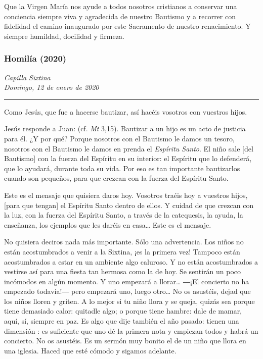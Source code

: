 \begin{body}
\begin{body}
{Que la Virgen María nos ayude a todos nosotros cristianos a conservar una conciencia siempre viva y agradecida de nuestro Bautismo y a recorrer con fidelidad el camino inaugurado por este Sacramento de nuestro renacimiento. Y siempre humildad, docilidad y firmeza.

\subsubsection{Homilía (2020)} \emph{Capilla Sixtina\\ Domingo, 12 de enero de 2020}

\begin{center}\rule{0.5\linewidth}{\linethickness}\end{center}



Como Jesús, que fue a hacerse bautizar, así hacéis vosotros con vuestros hijos.

Jesús responde a Juan:  (cf. \emph{Mt} 3,15). Bautizar a un hijo es un acto de justicia para él. ¿Y por qué? Porque nosotros con el Bautismo le damos un tesoro, nosotros con el Bautismo le damos en prenda el \emph{Espíritu Santo}. El niño sale {[}del Bautismo{]} con la fuerza del Espíritu en su interior: el Espíritu que lo defenderá, que lo ayudará, durante toda su vida. Por eso es tan importante bautizarlos cuando son pequeños, para que crezcan con la fuerza del Espíritu Santo.

Este es el mensaje que quisiera daros hoy. Vosotros traéis hoy a vuestros hijos, {[}para que tengan{]} el Espíritu Santo dentro de ellos. Y cuidad de que crezcan con la luz, con la fuerza del Espíritu Santo, a través de la catequesis, la ayuda, la enseñanza, los ejemplos que les daréis en casa\ldots{} Este es el mensaje.

No quisiera deciros nada más importante. Sólo una advertencia. Los niños no están acostumbrados a venir a la Sixtina, ¡es la primera vez! Tampoco están acostumbrados a estar en un ambiente algo caluroso. Y no están acostumbrados a vestirse así para una fiesta tan hermosa como la de hoy. Se sentirán un poco incómodos en algún momento. Y uno empezará a llorar\ldots{} ―¡El concierto no ha empezado todavía!― pero empezará uno, luego otro\ldots{} No os asustéis, dejad que los niños lloren y griten. A lo mejor si tu niño llora y se queja, quizás sea porque tiene demasiado calor: quitadle algo; o porque tiene hambre: dale de mamar, aquí, sí, siempre en paz. Es algo que dije también el año pasado: tienen una dimensión : es suficiente que uno dé la primera nota y empiezan todos y habrá un concierto. No os asustéis. Es un sermón muy bonito el de un niño que llora en una iglesia. Haced que esté cómodo y sigamos adelante.

}
\end{body}
\end{body}
